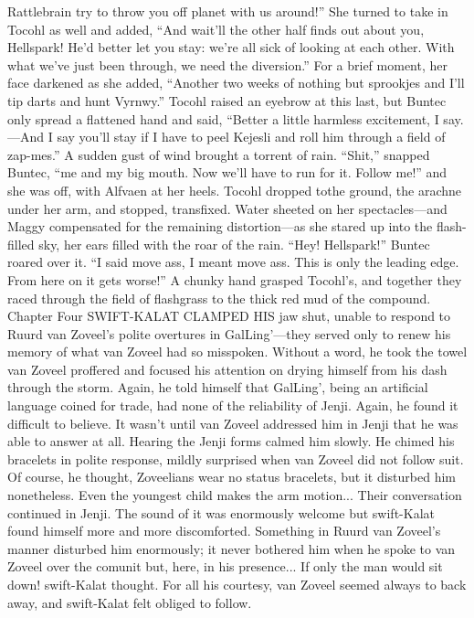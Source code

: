 \documentclass[9pt]{article}
\begin{document}
Rattlebrain try to throw you off planet with us around!”
She turned to take in Tocohl as well and added, “And wait’ll the other half finds out about you,
Hellspark! He’d better let you stay: we’re all sick of looking at each other. With what we’ve just been
through, we need the diversion.” For a brief moment, her face darkened as she added, “Another two
weeks of nothing but sprookjes and I’ll tip darts and hunt Vyrnwy.”
Tocohl raised an eyebrow at this last, but Buntec only spread a flattened hand and said, “Better a
little harmless excitement, I say.—And I say you’ll stay if I have to peel Kejesli and roll him through a
field of zap-mes.”
A sudden gust of wind brought a torrent of rain. “Shit,” snapped Buntec, “me and my big mouth.
Now we’ll have to run for it. Follow me!” and she was off, with Alfvaen at her heels. Tocohl dropped tothe ground, the arachne under her arm, and stopped, transfixed. Water sheeted on her spectacles—and
Maggy compensated for the remaining distortion—as she stared up into the flash-filled sky, her ears filled
with the roar of the rain.
“Hey! Hellspark!” Buntec roared over it. “I said move ass, I meant move ass. This is only the
leading edge. From here on it gets worse!” A chunky hand grasped Tocohl’s, and together they raced
through the field of flashgrass to the thick red mud of the compound.
Chapter Four
SWIFT-KALAT CLAMPED HIS jaw shut, unable to respond to Ruurd van Zoveel’s polite
overtures in GalLing’—they served only to renew his memory of what van Zoveel had so misspoken.
Without a word, he took the towel van Zoveel proffered and focused his attention on drying himself from
his dash through the storm. Again, he told himself that GalLing’, being an artificial language coined for
trade, had none of the reliability of Jenji. Again, he found it difficult to believe.
It wasn’t until van Zoveel addressed him in Jenji that he was able to answer at all. Hearing the Jenji
forms calmed him slowly. He chimed his bracelets in polite response, mildly surprised when van Zoveel
did not follow suit. Of course, he thought, Zoveelians wear no status bracelets, but it disturbed him
nonetheless. Even the youngest child makes the arm motion...
Their conversation continued in Jenji. The sound of it was enormously welcome but swift-Kalat found
himself more and more discomforted. Something in Ruurd van Zoveel’s manner disturbed him
enormously; it never bothered him when he spoke to van Zoveel over the comunit but, here, in his
presence... If only the man would sit down! swift-Kalat thought. For all his courtesy, van Zoveel seemed
always to back away, and swift-Kalat felt obliged to follow.
\end{document}
